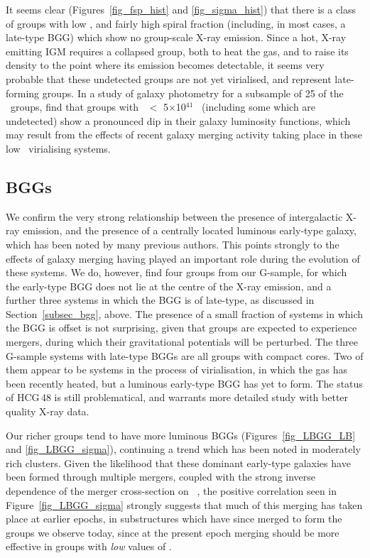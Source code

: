 \documentclass[usenatbib]{mn2e}
\begin{document}
It seems clear (Figures~\ref{fig_fsp_hist} and \ref{fig_sigma_hist}) that
there is a class of groups with low \sigmav, and fairly high spiral fraction
(including, in most cases, a late-type BGG) which show no group-scale X-ray
emission.  Since a hot, X-ray emitting IGM requires a collapsed group, both to
heat the gas, and to raise its density to the point where its emission becomes
detectable, it seems very probable that these undetected groups are not yet
virialised, and represent late-forming groups. In a study of galaxy photometry
for a subsample of 25 of the \GEMS\ groups, \citet{miles04} find that groups with
\LX\ $<$ 5$\times$10$^{41}$ \ergps\ (including some which are undetected) show a
pronounced dip in their galaxy luminosity functions, which may result from the 
effects of recent galaxy merging activity taking place in these low \sigmav\
virialising systems.


\subsection{BGGs}

We confirm the very strong relationship between the presence of intergalactic
X-ray emission, and the presence of a centrally located luminous early-type
galaxy, which has been noted by many previous authors.  This points strongly to
the effects of galaxy merging having played an important role during the
evolution of these systems.  We do, however, find four groups from our G-sample,
for which the early-type BGG does not lie at the centre of the X-ray emission,
and a further three systems in which the BGG is of late-type, as discussed in
Section~\ref{subsec_bgg}, above.  The presence of a small fraction of systems in
which the BGG is offset is not surprising, given that groups are expected to
experience mergers, during which their gravitational potentials will be
perturbed.  The three G-sample systems with late-type BGGs are all groups with
compact cores.  Two of them appear to be systems in the process of virialisation,
in which the gas has been recently heated, but a luminous early-type BGG has yet
to form. The status of HCG\,48 is still problematical, and warrants more detailed
study with better quality X-ray data.

Our richer groups tend to have more luminous BGGs (Figures~\ref{fig_LBGG_LB} and 
\ref{fig_LBGG_sigma}), continuing a trend which has been noted in moderately rich
clusters.  Given the likelihood \citep{dubinski98} that these dominant early-type
galaxies have been formed through multiple mergers, coupled with the strong
inverse dependence of the merger cross-section on \sigmav\ \citep{makino97}, the
positive correlation seen in Figure~\ref{fig_LBGG_sigma} strongly suggests that
much of this merging has taken place at earlier epochs, in substructures which
have since merged to form the groups we observe today, since at the present epoch
merging should be more effective in groups with {\it low} values of \sigmav.
\end{document}
